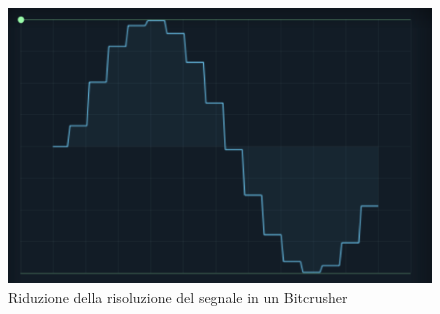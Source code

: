 \begin{figure}[!h] 
    \centering 
    \includegraphics[width=0.8\columnwidth]{immagini/cap2/bitcrusher.png}
    \caption{Riduzione della risoluzione del segnale in un Bitcrusher}
\end{figure}

